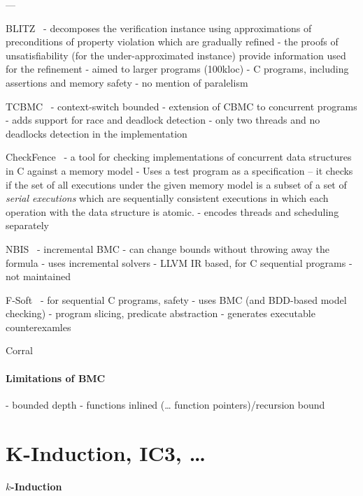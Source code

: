 

---

BLITZ~\cite{Cho2013}
- decomposes the verification instance using approximations of preconditions of property violation which are gradually refined
- the proofs of unsatisfiability (for the under-approximated instance) provide information used for the refinement
- aimed to larger programs (100kloc)
- C programs, including assertions and memory safety
- no mention of paralelism

TCBMC~\cite{Rabinovitz2005}
- context-switch bounded
- extension of CBMC to concurrent programs
- adds support for race and deadlock detection
- only two threads and no deadlocks detection in the implementation

CheckFence~\cite{Burckhardt2007}
- a tool for checking implementations of concurrent data structures in C against a memory model
- Uses a test program as a specification -- it checks if the set of all executions under the given memory model is a subset of a set of \emph{serial executions} which are sequentially consistent executions in which each operation with the data structure is atomic.
- encodes threads and scheduling separately


NBIS~\cite{Gunther2016}
- incremental BMC - can change bounds without throwing away the formula
- uses incremental solvers
- LLVM IR based, for C sequential programs
- not maintained

F-Soft~\cite{Ivancic2005}
- for sequential C programs, safety
- uses BMC (and BDD-based model checking)
- program slicing, predicate abstraction
- generates executable counterexamles


Corral

\paragraph{Limitations of BMC}

- bounded depth
- functions inlined (… function pointers)/recursion bound

\section{K-Induction, IC3, …}

\paragraph{$k$-Induction}


